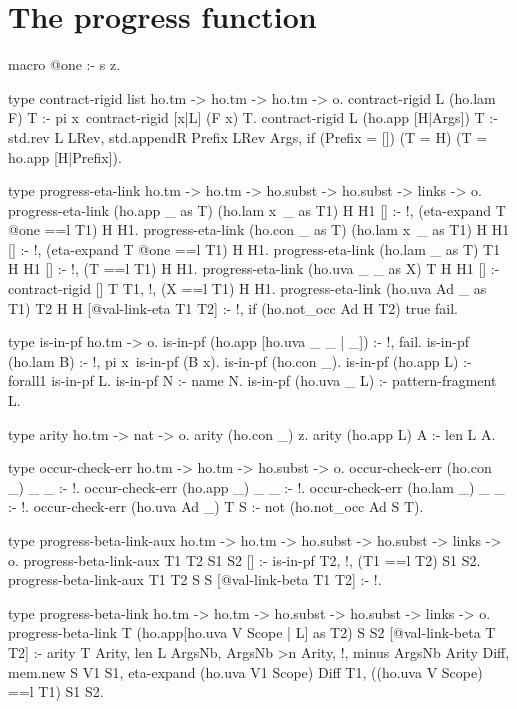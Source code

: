\section{The progress function}

\begin{elpicode}
  
  macro @one :- s z.

  type contract-rigid list ho.tm -> ho.tm -> ho.tm -> o.
  contract-rigid L (ho.lam F) T :- 
    pi x\ contract-rigid [x|L] (F x) T. %
  contract-rigid L (ho.app [H|Args]) T :- 
    std.rev L LRev, std.appendR Prefix LRev Args,
    if (Prefix = []) (T = H) (T = ho.app [H|Prefix]).

  type progress-eta-link ho.tm -> ho.tm -> ho.subst -> ho.subst -> links -> o.
  progress-eta-link (ho.app _ as T) (ho.lam x\ _ as T1) H H1 [] :- !, 
    ({eta-expand T @one} ==l T1) H H1.
  progress-eta-link (ho.con _ as T) (ho.lam x\ _ as T1) H H1 [] :- !, 
    ({eta-expand T @one} ==l T1) H H1.
  progress-eta-link (ho.lam _ as T) T1 H H1 [] :- !, 
    (T ==l T1) H H1.
  progress-eta-link (ho.uva _ _ as X) T H H1 [] :- 
    contract-rigid [] T T1, !, (X ==l T1) H H1.
  progress-eta-link (ho.uva Ad _ as T1) T2 H H [@val-link-eta T1 T2] :- !, 
    if (ho.not_occ Ad H T2) true fail.

  type is-in-pf ho.tm -> o.
  is-in-pf (ho.app [ho.uva _ _ | _]) :- !, fail.
  is-in-pf (ho.lam B) :- !, pi x\ is-in-pf (B x).
  is-in-pf (ho.con _).
  is-in-pf (ho.app L) :- forall1 is-in-pf L.
  is-in-pf N :- name N.
  is-in-pf (ho.uva _ L) :- pattern-fragment L.

  type arity ho.tm -> nat -> o.
  arity (ho.con _) z.
  arity (ho.app L) A :- len L A.

  type occur-check-err ho.tm -> ho.tm -> ho.subst -> o.
  occur-check-err (ho.con _) _ _ :- !.
  occur-check-err (ho.app _) _ _ :- !.
  occur-check-err (ho.lam _) _ _ :- !.
  occur-check-err (ho.uva Ad _) T S :-
    not (ho.not_occ Ad S T).

  type progress-beta-link-aux ho.tm -> ho.tm -> 
          ho.subst -> ho.subst -> links -> o.
  progress-beta-link-aux T1 T2 S1 S2 [] :-  is-in-pf T2, !,
    (T1 ==l T2) S1 S2.
  progress-beta-link-aux T1 T2 S S [@val-link-beta T1 T2] :- !.

  type progress-beta-link ho.tm -> ho.tm -> ho.subst -> 
        ho.subst -> links -> o.
  progress-beta-link T (ho.app[ho.uva V Scope | L] as T2) S S2 [@val-link-beta T T2] :- 
    arity T Arity, len L ArgsNb, ArgsNb >n Arity, !,
    minus ArgsNb Arity Diff, mem.new S V1 S1,
    eta-expand (ho.uva V1 Scope) Diff T1,
    ((ho.uva V Scope) ==l T1) S1 S2.


\end{elpicode}

